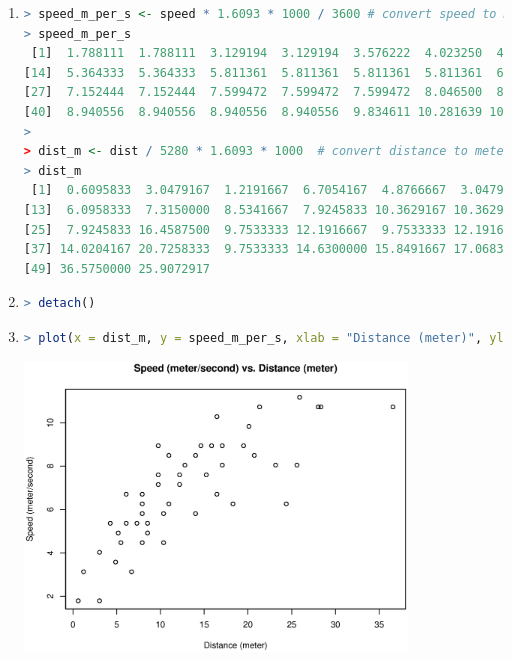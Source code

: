 \documentclass{article}
\begin{document}
\begin{enumerate}[leftmargin = 0 em, label = \arabic*., font = \bfseries]
\begin{enumerate}
\item
\begin{lstlisting}[language = R]
> speed_m_per_s <- speed * 1.6093 * 1000 / 3600 # convert speed to meter per second
> speed_m_per_s
 [1]  1.788111  1.788111  3.129194  3.129194  3.576222  4.023250  4.470278  4.470278  4.470278  4.917306  4.917306  5.364333  5.364333
[14]  5.364333  5.364333  5.811361  5.811361  5.811361  5.811361  6.258389  6.258389  6.258389  6.258389  6.705417  6.705417  6.705417
[27]  7.152444  7.152444  7.599472  7.599472  7.599472  8.046500  8.046500  8.046500  8.046500  8.493528  8.493528  8.493528  8.940556
[40]  8.940556  8.940556  8.940556  8.940556  9.834611 10.281639 10.728667 10.728667 10.728667 10.728667 11.175694
> 
> dist_m <- dist / 5280 * 1.6093 * 1000  # convert distance to meter
> dist_m
 [1]  0.6095833  3.0479167  1.2191667  6.7054167  4.8766667  3.0479167  5.4862500  7.9245833 10.3629167  5.1814583  8.5341667  4.2670833
[13]  6.0958333  7.3150000  8.5341667  7.9245833 10.3629167 10.3629167 14.0204167  7.9245833 10.9725000 18.2875000 24.3833333  6.0958333
[25]  7.9245833 16.4587500  9.7533333 12.1916667  9.7533333 12.1916667 15.2395833 12.8012500 17.0683333 23.1641667 25.6025000 10.9725000
[37] 14.0204167 20.7258333  9.7533333 14.6300000 15.8491667 17.0683333 19.5066667 20.1162500 16.4587500 21.3354167 28.0408333 28.3456250
[49] 36.5750000 25.9072917
\end{lstlisting}

\item
\begin{lstlisting}[language = R]
> detach()
\end{lstlisting}

\item
\begin{lstlisting}[language = R]
> plot(x = dist_m, y = speed_m_per_s, xlab = "Distance (meter)", ylab = "Speed (meter/second)", main = "Speed (meter/second) vs. Distance (meter)") # plot speed (meter/second) against distance (meter)
\end{lstlisting}

\begin{center}
	\includegraphics[width = 0.8\textwidth]{speed-vs-distance-m.eps}
\end{center}


\end{enumerate}
\end{enumerate}
\end{document}
